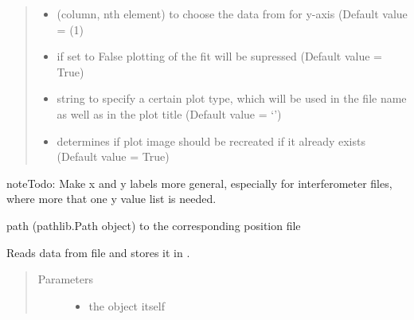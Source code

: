 \documentclass[letterpaper,10pt,english]{sphinxmanual}
\begin{document}
\begin{fulllineitems}
\begin{fulllineitems}
\begin{quote}
\begin{description}
\begin{itemize}
\item {} 
 \textendash{} (column, nth element) to choose the data from for y-axis (Default value = (1)

\item {} 
 \textendash{} if set to False plotting of the fit will be supressed (Default value = True)

\item {} 
 \textendash{} string to specify a certain plot type, which will be used
in the file name as well as in the plot title (Default value = ‘’)

\item {} 
 \textendash{} determines if plot image should be recreated if it already exists (Default value = True)

\end{itemize}

\end{description}\end{quote}

\begin{sphinxadmonition}{note}{\label{measurement:index-5}Todo:}
Make x and y labels more general, especially for interferometer files, where more that one y value list is needed.
\end{sphinxadmonition}

\end{fulllineitems}


\begin{fulllineitems}
\label{\detokenize{measurement:measurement.Measurement.pos_file_path}}
path (pathlib.Path object) to the corresponding position file

\end{fulllineitems}


\begin{fulllineitems}
\label{\detokenize{measurement:measurement.Measurement.read_data}}
Reads data from file and stores it in .
\begin{quote}\begin{description}
\item[{Parameters}] \leavevmode\begin{itemize}
\item {} 
 \textendash{} the object itself


\end{itemize}
\end{description}
\end{quote}
\end{fulllineitems}
\end{fulllineitems}
\end{document}
